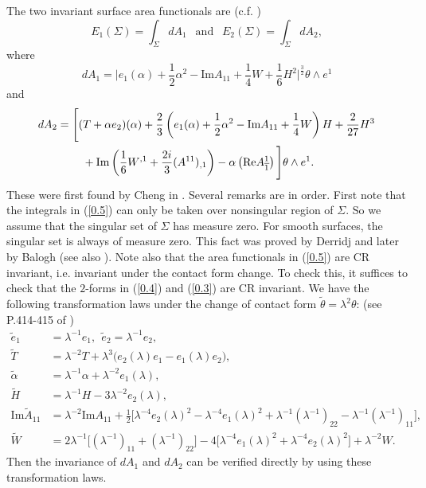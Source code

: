\documentclass{amsart}
\theoremstyle{Corollary}
\numberwithin{equation}{section}
\begin{document}
The two invariant surface area functionals
are (c.f. \cite{CYZ})
\begin{equation}\label{0.5}
E_1(\Sigma)=\int_\Sigma dA_1~~\mbox{ and }~~E_2(\Sigma)=\int_\Sigma dA_2,
\end{equation}
where 
\begin{equation}\label{0.4}
dA_1=\Big|e_1(\alpha)+\frac{1}{2}\alpha^2-\mbox{Im} A_{11}+\frac{1}{4}W+\frac{1}{6}H^2\Big|^{\frac{3}{2}}\theta\wedge e^1
\end{equation}
and 
\begin{equation}\label{0.3}
\begin{split}
dA_2 &=\Bigg[(T+\alpha e_2)(\alpha)+\frac{2}{3}\left(e_1(\alpha)+\frac{1}{2}\alpha^2-\mbox{Im} A_{11}+\frac{1}{4}W\right)H+\frac{2}{27}H^3\\
&\hspace{8mm}+\mbox{Im}\left(\frac{1}{6}W^{,1}+\frac{2i}{3}(A^{11})_{,1}\right)-\alpha\left(\mbox{Re} A^1_{\overline{1}}\right)\Bigg]\theta\wedge e^1.
\end{split}
\end{equation}
These were first found by Cheng in \cite{C}. 
Several remarks are in order. 
First note that
the integrals in (\ref{0.5})
 can only be taken over nonsingular 
region of $\Sigma$. 
So we assume
that the singular set of $\Sigma$ 
has measure zero. 
For smooth surfaces, 
the singular set is always of measure zero.
This fact was proved by 
Derridj and later by Balogh \cite{Balogh}
(see also \cite[Theorem D]{CHY}). 
Note also that 
the area functionals in (\ref{0.5})
are CR invariant, i.e. invariant under the contact form change. 
To check this, it suffices to check that the $2$-forms
in (\ref{0.4}) and (\ref{0.3}) are CR invariant. 
We have the following transformation laws under the change of contact form 
$\tilde{\theta}=\lambda^2\theta$: (see P.414-415 of \cite{CYZ})
\begin{align*}
\tilde{e}_1&=\lambda^{-1}e_1,~~\tilde{e}_2=\lambda^{-1}e_2,\\
\tilde{T}&=\lambda^{-2}T+\lambda^3\big(e_2(\lambda)e_1-e_1(\lambda) e_2\big),\\
\tilde{\alpha}&=\lambda^{-1}\alpha+\lambda^{-2}e_1(\lambda),\\
\tilde{H}&=\lambda^{-1}H-3\lambda^{-2}e_2(\lambda),\\
\mbox{Im}\widetilde{A}_{11}&=\lambda^{-2}\mbox{Im}A_{11}+\frac{1}{2}\big[\lambda^{-4}e_2(\lambda)^2-\lambda^{-4}e_1(\lambda)^2
+\lambda^{-1}(\lambda^{-1})_{22}-\lambda^{-1}(\lambda^{-1})_{11}\big],\\
\widetilde{W}&=2\lambda^{-1}\big[ (\lambda^{-1})_{11}+(\lambda^{-1})_{22}\big]
-4\big[\lambda^{-4}e_1(\lambda)^2+\lambda^{-4}e_2(\lambda)^2\big]+\lambda^{-2}W.
\end{align*}
Then the invariance of $dA_1$ and $dA_2$ can be verified directly by using 
these transformation laws. 
\end{document}
